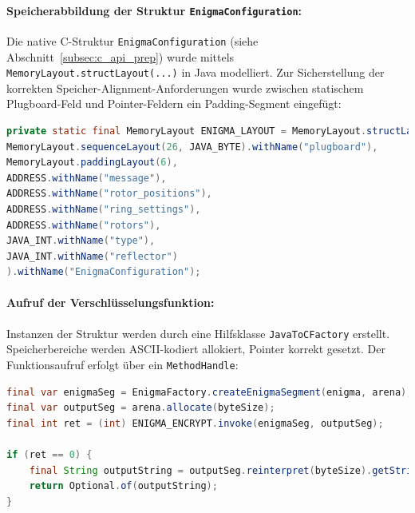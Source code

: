 \documentclass[12pt, ngerman, a4paper, numbers=noenddot]{article}
\begin{document}
\paragraph{Speicherabbildung der Struktur \lstinline|EnigmaConfiguration|:}
Die native C-Struktur \lstinline|EnigmaConfiguration| (siehe Abschnitt~\ref{subsec:c_api_prep}) wurde mittels \newline\lstinline|MemoryLayout.structLayout(...)| in Java modelliert. Zur Sicherstellung der korrekten Speicher-Alignment-Anforderungen wurde zwischen statischem Plugboard-Feld und Pointer-Feldern ein Padding-Segment eingefügt:

\begin{lstlisting}[language=Java, caption={FFM-Deklaration der Struktur \lstinline|EnigmaConfiguration|}, label={lst:ffm-layout}]
private static final MemoryLayout ENIGMA_LAYOUT = MemoryLayout.structLayout(
MemoryLayout.sequenceLayout(26, JAVA_BYTE).withName("plugboard"),
MemoryLayout.paddingLayout(6),
ADDRESS.withName("message"),
ADDRESS.withName("rotor_positions"),
ADDRESS.withName("ring_settings"),
ADDRESS.withName("rotors"),
JAVA_INT.withName("type"),
JAVA_INT.withName("reflector")
).withName("EnigmaConfiguration");
\end{lstlisting}

\paragraph{Aufruf der Verschlüsselungsfunktion:}
Instanzen der Struktur werden durch eine Hilfsklasse \lstinline|JavaToCFactory| erstellt. Speicherbereiche werden ASCII-kodiert allokiert, Pointer korrekt gesetzt. \newline Der Funktionsaufruf erfolgt über ein \lstinline|MethodHandle|:


\begin{lstlisting}[language=Java, caption={Aufruf der FFM-Funktion \lstinline|enigma_encrypt|}, label={lst:ffm-encrypt}]
final var enigmaSeg = EnigmaFactory.createEnigmaSegment(enigma, arena);
final var outputSeg = arena.allocate(byteSize);
final int ret = (int) ENIGMA_ENCRYPT.invoke(enigmaSeg, outputSeg);

if (ret == 0) {
	final String outputString = outputSeg.reinterpret(byteSize).getString(0);
	return Optional.of(outputString);
}
\end{lstlisting}

\newpage
\end{document}
